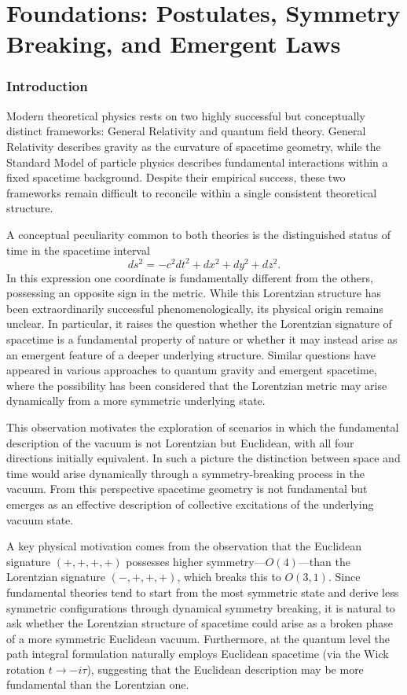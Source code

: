 \documentclass[11pt,a4paper]{article}
\numberwithin{equation}{section}
\begin{document}
\part{Foundations: Postulates, Symmetry Breaking, and Emergent Laws}
\label{part:foundations}

\section{Introduction}

Modern theoretical physics rests on two highly successful but
conceptually distinct frameworks: General Relativity and quantum field
theory. General Relativity describes gravity as the curvature of
spacetime geometry, while the Standard Model of particle physics
describes fundamental interactions within a fixed spacetime background.
Despite their empirical success, these two frameworks remain difficult
to reconcile within a single consistent theoretical structure.

A conceptual peculiarity common to both theories is the distinguished
status of time in the spacetime interval
\[
ds^2 = -c^2 dt^2 + dx^2 + dy^2 + dz^2 .
\]
In this expression one coordinate is fundamentally different from the
others, possessing an opposite sign in the metric. While this
Lorentzian structure has been extraordinarily successful
phenomenologically, its physical origin remains unclear. In particular,
it raises the question whether the Lorentzian signature of spacetime is
a fundamental property of nature or whether it may instead arise as an
emergent feature of a deeper underlying structure. Similar questions
have appeared in various approaches to quantum gravity and emergent
spacetime, where the possibility has been considered that the
Lorentzian metric may arise dynamically from a more symmetric
underlying state.

This observation motivates the exploration of scenarios in which the
fundamental description of the vacuum is not Lorentzian but Euclidean,
with all four directions initially equivalent. In such a picture the
distinction between space and time would arise dynamically through a
symmetry-breaking process in the vacuum. From this perspective spacetime
geometry is not fundamental but emerges as an effective description of
collective excitations of the underlying vacuum state.

A key physical motivation comes from the observation that the Euclidean
signature $(+,+,+,+)$ possesses higher symmetry---$O(4)$---than the
Lorentzian signature $(-,+,+,+)$, which breaks this to $O(3,1)$.
Since fundamental theories tend to start from the most symmetric
state and derive less symmetric configurations through dynamical
symmetry breaking, it is natural to ask whether the Lorentzian
structure of spacetime could arise as a broken phase of a more
symmetric Euclidean vacuum.
Furthermore, at the quantum level the path integral formulation
naturally employs Euclidean spacetime (via the Wick rotation
$t \to -i\tau$), suggesting that the Euclidean description may
be more fundamental than the Lorentzian one.
\end{document}
